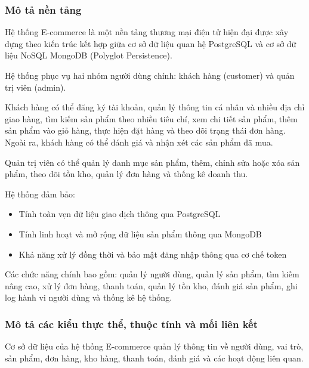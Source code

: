 \subsubsection{Mô tả nền tảng}
Hệ thống E-commerce là một nền tảng thương mại điện tử hiện đại được xây dựng theo kiến trúc kết hợp giữa cơ sở dữ liệu quan hệ PostgreSQL và cơ sở dữ liệu NoSQL MongoDB (Polyglot Persistence). \medskip

Hệ thống phục vụ hai nhóm người dùng chính: khách hàng (customer) và quản trị viên (admin). \medskip

Khách hàng có thể đăng ký tài khoản, quản lý thông tin cá nhân và nhiều địa chỉ giao hàng, tìm kiếm sản phẩm theo nhiều tiêu chí, xem chi tiết sản phẩm, thêm sản phẩm vào giỏ hàng, thực hiện đặt hàng và theo dõi trạng thái đơn hàng. Ngoài ra, khách hàng có thể đánh giá và nhận xét các sản phẩm đã mua.\medskip

Quản trị viên có thể quản lý danh mục sản phẩm, thêm, chỉnh sửa hoặc xóa sản phẩm, theo dõi tồn kho, quản lý đơn hàng và thống kê doanh thu.\medskip

Hệ thống đảm bảo:
\begin{itemize}[label=$\circ$]
    \item Tính toàn vẹn dữ liệu giao dịch thông qua PostgreSQL
    \item Tính linh hoạt và mở rộng dữ liệu sản phẩm thông qua MongoDB
    \item Khả năng xử lý đồng thời và bảo mật đăng nhập thông qua cơ chế token
\end{itemize}

Các chức năng chính bao gồm: quản lý người dùng, quản lý sản phẩm, tìm kiếm nâng cao, xử lý đơn hàng, thanh toán, quản lý tồn kho, đánh giá sản phẩm, ghi log hành vi người dùng và thống kê hệ thống.

\subsubsection{Mô tả các kiểu thực thể, thuộc tính và mối liên kết}
Cơ sở dữ liệu của hệ thống E-commerce quản lý thông tin về người dùng, vai trò, sản phẩm, đơn hàng, kho hàng, thanh toán, đánh giá và các hoạt động liên quan.

